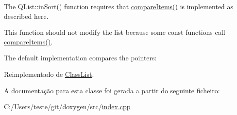 The Q\-List\-::in\-Sort() function requires that \hyperlink{class_prefix_ignore_class_list_aade9045d8c0047e0427d8c6a9c048985}{compare\-Items()} is implemented as described here.

This function should not modify the list because some const functions call \hyperlink{class_prefix_ignore_class_list_aade9045d8c0047e0427d8c6a9c048985}{compare\-Items()}.

The default implementation compares the pointers\-: 
\begin{DoxyCode}
\end{DoxyCode}
 

Reimplementado de \hyperlink{class_class_list_a219450accf048597ffc7113ecde4c402}{Class\-List}.



A documentação para esta classe foi gerada a partir do seguinte ficheiro\-:\begin{DoxyCompactItemize}
\item 
C\-:/\-Users/teste/git/doxygen/src/\hyperlink{index_8cpp}{index.\-cpp}\end{DoxyCompactItemize}
